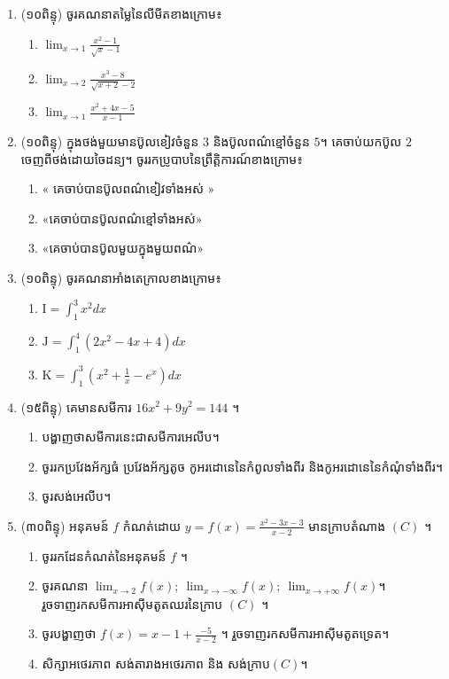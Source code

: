 \documentclass{officialexam}
\begin{document}
\newpage 
\maketitle 
\begin{enumerate}[I]
\item (១០ពិន្ទុ) ចូរគណនាតម្លៃនៃលីមីតខាងក្រោម៖
\begin{enumerate}[k,3]
\item $\lim_{x\to 1}\frac{x^2-1}{\sqrt{x}-1}$ 
\item $\lim_{x\to 2}\frac{x^3-8}{\sqrt{x+2}-2}$
\item $\lim_{x\to 1}\frac{x^2+4x-5}{x-1}$
\end{enumerate}
\item (១០ពិន្ទុ) ក្នុងថង់មួយមានប៊ូលខៀវចំនួន $3$ និងប៊ូលពណ៌ខ្មៅចំនួន $5$។ គេចាប់យកប៊ូល $2$ ចេញពីថង់ដោយចៃដន្យ។ ចូររកប្រូបាបនៃព្រឹត្តិការណ៍ខាងក្រោម៖
\begin{enumerate}[k]
\item « គេចាប់បានប៊ូលពណ៌ខៀវទាំងអស់ »
\item «គេចាប់បានប៊ូលពណ៌ខ្មៅទាំងអស់»
\item «គេចាប់បានប៊ូលមួយក្នុងមួយពណ៌»
\end{enumerate}
\item (១០ពិន្ទុ)  ចូរគណនាអាំងតេក្រាលខាងក្រោម៖
\begin{enumerate}[k,3]
\item $\mathrm{I}=\int_1^3x^2dx$
\item $\mathrm{J}=\int_1^4\left(2x^2-4x+4\right)dx$
\item $\mathrm{K}=\int_1^3\left(x^2+\frac{1}{x}-e^x\right)dx$
\end{enumerate}
\item (១៥ពិន្ទុ) គេមានសមីការ $16x^2+9y^2=144$ ។
\begin{enumerate}[k]
\item បង្ហាញថាសមីការនេះជាសមីការអេលីប។
\item ចូររកប្រវែងអ័ក្សធំ ប្រវែងអ័ក្សតូច កូអរដោនេនៃកំពូលទាំងពីរ និងកូអរដោនេនៃកំណុំទាំងពីរ។
\item ចូរសង់អេលីប។
\end{enumerate}
\item (៣០ពិន្ទុ) អនុគមន៍ $f$ កំណត់ដោយ $y=f(x)=\frac{x^2-3x-3}{x-2}$ មានក្រាបតំណាង $(C)$ ។
\begin{enumerate}[k]
\item ចូររកដែនកំណត់នៃអនុគមន៍ $f$ ។
\item ចូរគណនា $\lim_{x\to 2}f(x);\ \lim_{x\to -\infty}f(x);\ \lim_{x\to +\infty}f(x)$។ រួចទាញរកសមីការអាស៊ីមតូតឈរនៃក្រាប $(C)$ ។
\item ចូរបង្ហាញថា $f(x)=x-1+\frac{-5}{x-2}$ ។ រួចទាញរកសមីការអាស៊ីមតូតទ្រេត។
\item សិក្សាអថេរភាព សង់តារាងអថេរភាព និង សង់ក្រាប$(C)$។ 
\end{enumerate}
\end{enumerate}
\end{document}
